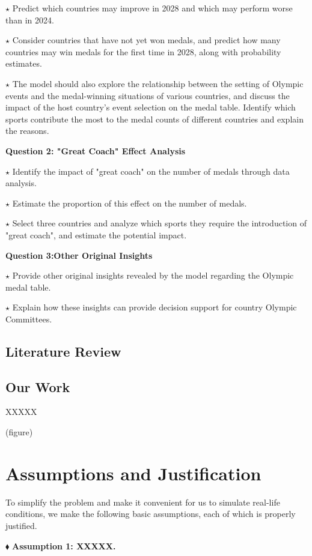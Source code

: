 \documentclass{mcmthesis}
\begin{document}
$\star$ Predict which countries may improve in 2028 and which may perform worse than in 2024.

$\star$ Consider countries that have not yet won medals, and predict how many countries may win medals for the first time in 2028, along with probability estimates.

$\star$ The model should also explore the relationship between the setting of Olympic events and the medal-winning situations of various countries, and discuss the impact of the host country's event selection on the medal table. Identify which sports contribute the most to the medal counts of different countries and explain the reasons.

{\bf Question 2: "Great Coach" Effect Analysis}

$\star$ Identify the impact of "great coach" on the number of medals through data analysis.

$\star$ Estimate the proportion of this effect on the number of medals.

$\star$ Select three countries and analyze which sports they require the introduction of  "great coach", and estimate the potential impact.

{\bf Question 3:Other Original Insights}

$\star$ Provide other original insights revealed by the model regarding the Olympic medal table.

$\star$ Explain how these insights can provide decision support for country Olympic Committees.

\subsection{Literature Review}

\subsection{Our Work}
XXXXX

(figure)

\section{Assumptions and Justification}

To simplify the problem and make it convenient for us to simulate real-life conditions, we make the following basic assumptions, each of which is properly justified.

$  \blacklozenge $  {\bf Assumption 1: XXXXX.}
\end{document}
